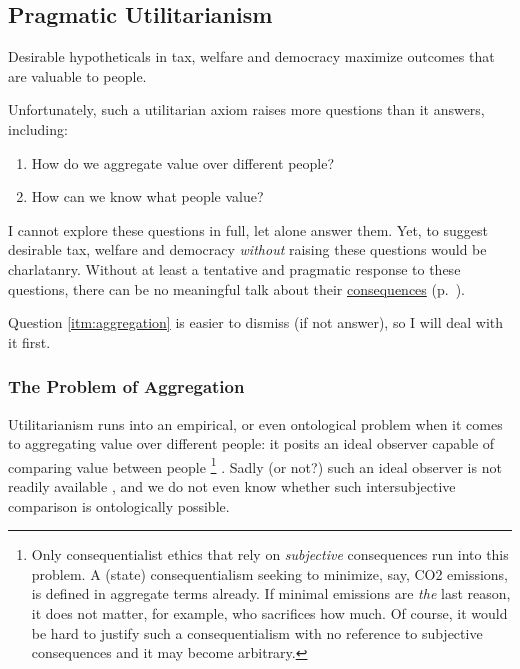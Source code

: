 \subsection[utilitarian]{Pragmatic Utilitarianism} \label{sec:utilitarian}%

Desirable hypotheticals in tax, welfare and democracy maximize outcomes that are valuable to people.

Unfortunately, such a utilitarian axiom raises more questions than 
it answers, including: 
\begin{enumerate}
	\item \label{itm:aggregation} How do we aggregate value over different people?
	\item \label{itm:utility} How can we know what people value?
\end{enumerate}
I cannot explore these questions in full, let alone answer them. 
Yet, to suggest desirable tax, welfare and democracy \emph{without} raising these questions would be charlatanry.
Without at least a tentative and pragmatic response to these questions, there can be no meaningful talk about their \hyperref[itm:consequentialism]{consequences} (p.~\pageref{itm:consequentialism}).

Question \ref{itm:aggregation} is easier to dismiss (if not answer), so I will deal with it first.

\subsubsection[Aggregation]{The Problem of Aggregation\label{sec:aggregation}} 

Utilitarianism runs into an empirical, or even ontological problem when it comes to aggregating value over different people: it posits an ideal observer capable of comparing value between people
\footnote{
	Only consequentialist ethics that rely on \emph{subjective} consequences run into this problem. 
	A (state) consequentialism seeking to minimize, say, CO2 emissions, is defined in aggregate terms already. 
	If minimal emissions are \emph{the} last reason, it does not matter, for example, who sacrifices how much.
	Of course, it would be hard to justify such a consequentialism with no reference to subjective consequences and it may become arbitrary.
}
. 
Sadly (or not?) such an ideal observer is not readily available \citep{Rawls1988}, and we do not even know whether such intersubjective comparison is ontologically possible.

